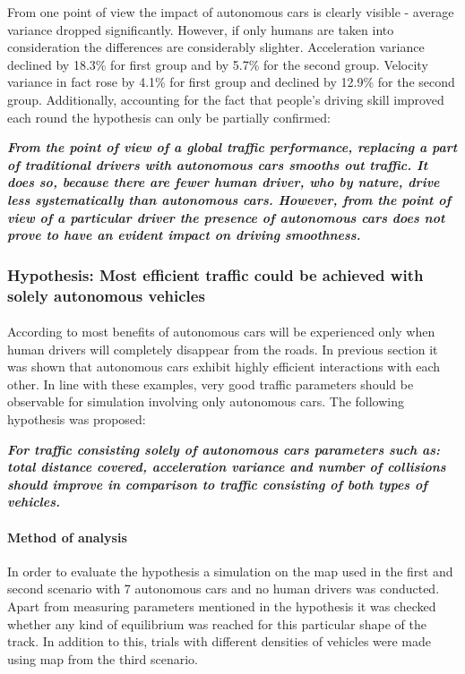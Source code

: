 \documentclass[11pt,english,twoside]{article}
\begin{document}
From one point of view the impact of autonomous cars is clearly visible - average variance dropped significantly. However, if only humans are taken into consideration the differences are considerably slighter. Acceleration variance declined by 18.3\% for first group and by 5.7\% for the second group. Velocity variance in fact rose by 4.1\% for first group and declined by 12.9\% for the second group. Additionally, accounting for the fact that people's driving skill improved each round the hypothesis can only be partially confirmed:

\textbf{\textit{From the point of view of a global traffic performance, replacing a part of traditional drivers with autonomous cars smooths out traffic. It does so, because there are fewer human driver, who by nature, drive less systematically than autonomous cars. However, from the point of view of a particular driver the presence of autonomous cars does not prove to have an evident impact on driving smoothness.}}





\subsubsection{Hypothesis: Most efficient traffic could be achieved with solely autonomous vehicles}
\paragraph{}
According to \citet{litman2014autonomous} most benefits of autonomous cars will be experienced only when human drivers will completely disappear from the roads. In previous section it was shown that autonomous cars exhibit highly efficient interactions with each other. In line with these examples, very good traffic parameters should be observable for simulation involving only autonomous cars. The following hypothesis was proposed:

\textbf{\textit{For traffic consisting solely of autonomous cars parameters such as: total distance covered, acceleration variance and number of collisions should improve in comparison to traffic consisting of both types of vehicles.}}

\paragraph{Method of analysis}
In order to evaluate the hypothesis a simulation on the map used in the first and second scenario with 7 autonomous cars and no human drivers was conducted. Apart from measuring parameters mentioned in the hypothesis it was checked whether any kind of equilibrium was reached for this particular shape of the track. In addition to this, trials with different densities of vehicles were made using map from the third scenario. 
\end{document}
